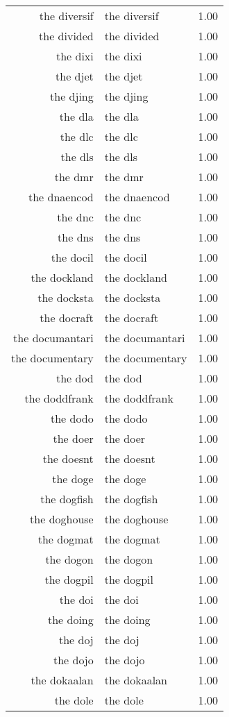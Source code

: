 \begin{table}[ht]
\begin{tabular}{rlr}
  the diversif & the diversif & 1.00 \\ 
  the divided & the divided & 1.00 \\ 
  the dixi & the dixi & 1.00 \\ 
  the djet & the djet & 1.00 \\ 
  the djing & the djing & 1.00 \\ 
  the dla & the dla & 1.00 \\ 
  the dlc & the dlc & 1.00 \\ 
  the dls & the dls & 1.00 \\ 
  the dmr & the dmr & 1.00 \\ 
  the dnaencod & the dnaencod & 1.00 \\ 
  the dnc & the dnc & 1.00 \\ 
  the dns & the dns & 1.00 \\ 
  the docil & the docil & 1.00 \\ 
  the dockland & the dockland & 1.00 \\ 
  the docksta & the docksta & 1.00 \\ 
  the docraft & the docraft & 1.00 \\ 
  the documantari & the documantari & 1.00 \\ 
  the documentary & the documentary & 1.00 \\ 
  the dod & the dod & 1.00 \\ 
  the doddfrank & the doddfrank & 1.00 \\ 
  the dodo & the dodo & 1.00 \\ 
  the doer & the doer & 1.00 \\ 
  the doesnt & the doesnt & 1.00 \\ 
  the doge & the doge & 1.00 \\ 
  the dogfish & the dogfish & 1.00 \\ 
  the doghouse & the doghouse & 1.00 \\ 
  the dogmat & the dogmat & 1.00 \\ 
  the dogon & the dogon & 1.00 \\ 
  the dogpil & the dogpil & 1.00 \\ 
  the doi & the doi & 1.00 \\ 
  the doing & the doing & 1.00 \\ 
  the doj & the doj & 1.00 \\ 
  the dojo & the dojo & 1.00 \\ 
  the dokaalan & the dokaalan & 1.00 \\ 
  the dole & the dole & 1.00 \\ 

\end{tabular}
\end{table}

